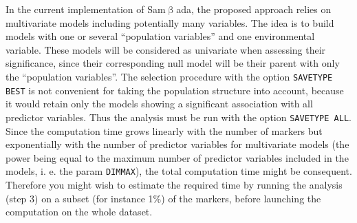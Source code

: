 \documentclass[a4paper,11pt]{article}
\newcommand{\smb}{\textsf{Sam$\upbeta$ada}}
\newcommand{\prog}[1]{\texttt{#1}}
\begin{document}
In the current implementation of \smb, the proposed approach relies on multivariate models including potentially many variables.
The idea is to build models with one or several \enquote{population variables} and one environmental variable.
These models will be considered as univariate when assessing their significance, since their corresponding null model will be their parent with only the \enquote{population variables}.
The selection procedure with the option \prog{SAVETYPE BEST} is not convenient for taking the population structure into account, because it would retain only the models showing a significant association with all predictor variables.
Thus the analysis must be run with the option \prog{SAVETYPE ALL}.
Since the computation time grows linearly with the number of markers but exponentially with the number of predictor variables for multivariate models (the power being equal to the maximum number of predictor variables included in the models, i. e. the param \texttt{DIMMAX}), the total computation time might be consequent.
Therefore you might wish to estimate the required time by running the analysis (step 3) on a subset (for instance 1\%) of the markers, before launching the computation on the whole dataset.
\end{document}

